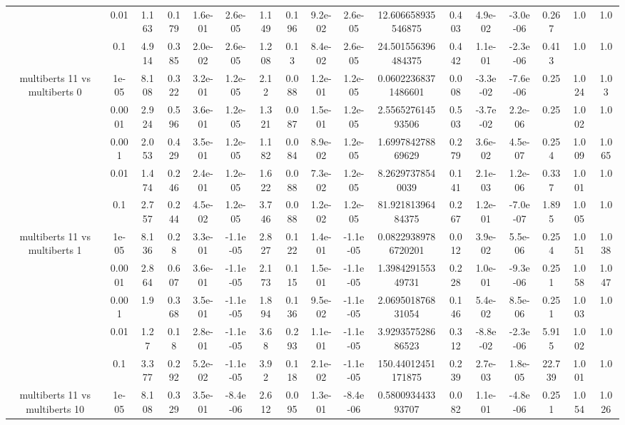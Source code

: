 \begin{tabular}{|c|c|c|c|c|c|c|c|c|c|c|c|c|c|c|c|c|}
 & 0.01 & 1.163 & 0.179 & 1.6e-01 & 2.6e-05 & 1.149 & 0.196 & 9.2e-02 & 2.6e-05 & 12.606658935546875 & 0.403 & 4.9e-02 & -3.0e-06 & 0.267 & 1.0 & 1.0 \\
 & 0.1 & 4.914 & 0.385 & 2.0e-02 & 2.6e-05 & 1.208 & 0.13 & 8.4e-02 & 2.6e-05 & 24.501556396484375 & 0.442 & 1.1e-01 & -2.3e-06 & 0.413 & 1.0 & 1.0 \\
\hline
\multirow{5}{*}{multiberts 11 vs multiberts 0} & 1e-05 & 8.108 & 0.322 & 3.2e-01 & 1.2e-05 & 2.12 & 0.088 & 1.2e-01 & 1.2e-05 & 0.06022368371486601 & 0.008 & -3.3e-02 & -7.6e-06 & 0.25 & 1.024 & 1.03 \\
 & 0.0001 & 2.924 & 0.596 & 3.6e-01 & 1.2e-05 & 1.321 & 0.087 & 1.5e-01 & 1.2e-05 & 2.556527614593506 & 0.503 & -3.7e-02 & 2.2e-06 & 0.25 & 1.002 & 1.0 \\
 & 0.001 & 2.053 & 0.429 & 3.5e-01 & 1.2e-05 & 1.182 & 0.084 & 8.9e-02 & 1.2e-05 & 1.699784278869629 & 0.279 & 3.6e-02 & 4.5e-07 & 0.254 & 1.009 & 1.065 \\
 & 0.01 & 1.474 & 0.246 & 2.4e-01 & 1.2e-05 & 1.622 & 0.088 & 7.3e-02 & 1.2e-05 & 8.26297378540039 & 0.141 & 2.1e-03 & 1.2e-06 & 0.337 & 1.001 & 1.0 \\
 & 0.1 & 2.757 & 0.244 & 4.5e-02 & 1.2e-05 & 3.746 & 0.088 & 1.2e-02 & 1.2e-05 & 81.92181396484375 & 0.267 & 1.2e-01 & -7.0e-07 & 1.895 & 1.005 & 1.0 \\
\hline
\multirow{5}{*}{multiberts 11 vs multiberts 1} & 1e-05 & 8.136 & 0.28 & 3.3e-01 & -1.1e-05 & 2.827 & 0.122 & 1.4e-01 & -1.1e-05 & 0.08229389786720201 & 0.012 & 3.9e-02 & 5.5e-06 & 0.254 & 1.051 & 1.038 \\
 & 0.0001 & 2.864 & 0.607 & 3.6e-01 & -1.1e-05 & 2.173 & 0.115 & 1.5e-01 & -1.1e-05 & 1.398429155349731 & 0.228 & 1.0e-01 & -9.3e-06 & 0.251 & 1.058 & 1.047 \\
 & 0.001 & 1.9 & 0.368 & 3.5e-01 & -1.1e-05 & 1.894 & 0.136 & 9.5e-02 & -1.1e-05 & 2.069501876831054 & 0.146 & 5.4e-02 & 8.5e-06 & 0.251 & 1.003 & 1.0 \\
 & 0.01 & 1.27 & 0.18 & 2.8e-01 & -1.1e-05 & 3.68 & 0.293 & 1.1e-01 & -1.1e-05 & 3.929357528686523 & 0.312 & -8.8e-02 & -2.3e-06 & 5.915 & 1.002 & 1.0 \\
 & 0.1 & 3.377 & 0.292 & 5.2e-02 & -1.1e-05 & 3.92 & 0.118 & 2.1e-02 & -1.1e-05 & 150.44012451171875 & 0.239 & 2.7e-03 & 1.8e-05 & 22.739 & 1.001 & 1.0 \\
\hline
\multirow{5}{*}{multiberts 11 vs multiberts 10} & 1e-05 & 8.108 & 0.329 & 3.5e-01 & -8.4e-06 & 2.612 & 0.095 & 1.3e-01 & -8.4e-06 & 0.580093443393707 & 0.082 & 1.1e-01 & -4.8e-06 & 0.251 & 1.054 & 1.026 \\

\end{tabular}
